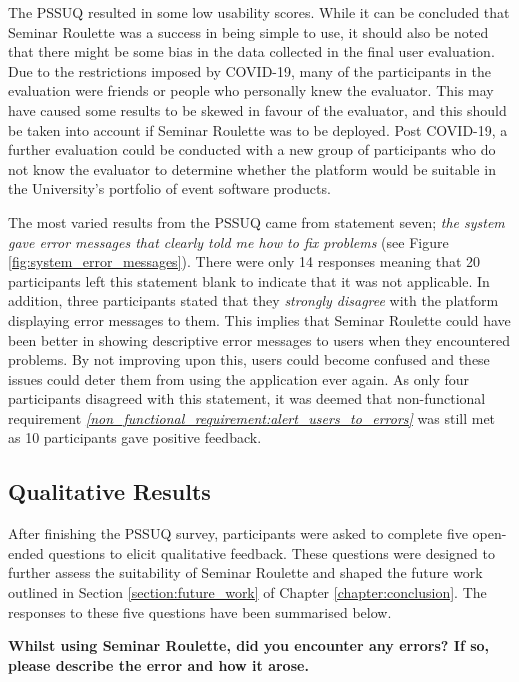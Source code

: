 \documentclass{l4proj}
\begin{document}
The PSSUQ resulted in some low usability scores. While it can be concluded that Seminar Roulette was a success in being simple to use, it should also be noted that there might be some bias in the data collected in the final user evaluation. Due to the restrictions imposed by COVID-19, many of the participants in the evaluation were friends or people who personally knew the evaluator. This may have caused some results to be skewed in favour of the evaluator, and this should be taken into account if Seminar Roulette was to be deployed. Post COVID-19, a further evaluation could be conducted with a new group of participants who do not know the evaluator to determine whether the platform would be suitable in the University's portfolio of event software products.

The most varied results from the PSSUQ came from statement seven; \emph{the system gave error messages that clearly told me how to fix problems} (see Figure \ref{fig:system_error_messages}). There were only 14 responses meaning that 20 participants left this statement blank to indicate that it was not applicable. In addition, three participants stated that they \emph{strongly disagree} with the platform displaying error messages to them. This implies that Seminar Roulette could have been better in showing descriptive error messages to users when they encountered problems. By not improving upon this, users could become confused and these issues could deter them from using the application ever again. As only four participants disagreed with this statement, it was deemed that non-functional requirement \emph{\ref{non_functional_requirement:alert_users_to_errors}} was still met as 10 participants gave positive feedback. 

\subsection{Qualitative Results}

After finishing the PSSUQ survey, participants were asked to complete five open-ended questions to elicit qualitative feedback. These questions were designed to further assess the suitability of Seminar Roulette and shaped the future work outlined in Section \ref{section:future_work} of Chapter \ref{chapter:conclusion}. The responses to these five questions have been summarised below.

\textbf{Whilst using Seminar Roulette, did you encounter any errors? If so, please describe the error and how it arose.}
\end{document}
